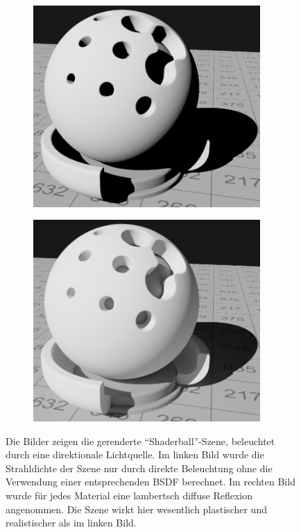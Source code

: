 		\begin{figure}[h]
			\begin{subfigure}[b]{0.5\textwidth}
				\center
				\includegraphics[width=0.95\textwidth]{pic/shaderball-bsdf-0.png}
			\end{subfigure}
			\begin{subfigure}[b]{0.5\textwidth}
				\center
				\includegraphics[width=0.95\textwidth]{pic/shaderball-bsdf-10.png}
			\end{subfigure}
			\caption{Die Bilder zeigen die gerenderte \enquote{Shaderball}-Szene, beleuchtet durch eine direktionale Lichtquelle. Im linken Bild wurde die Strahldichte der Szene nur durch direkte Beleuchtung ohne die Verwendung einer entsprechenden BSDF berechnet. Im rechten Bild wurde für jedes Material eine lambertsch diffuse Reflexion angenommen. Die Szene wirkt hier wesentlich plastischer und realistischer als im linken Bild.}
			\label{fig:shaderball-bsdf}
		\end{figure}

